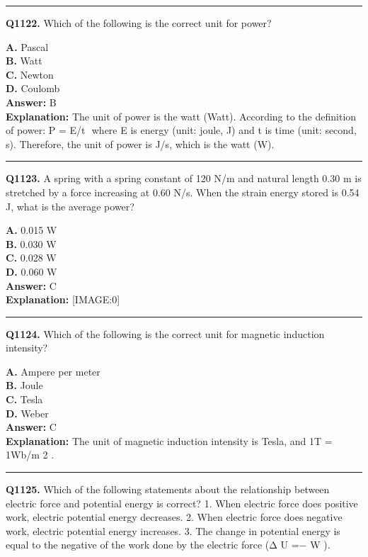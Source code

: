 \documentclass[12pt]{article}
\begin{document}
\hrule
\vspace{1em}


\noindent
\textbf{Q1122.} Which of the following is the correct unit for power?



\textbf{A.} Pascal \\
\textbf{B.} Watt \\
\textbf{C.} Newton \\
\textbf{D.} Coulomb \\

\textbf{Answer:} B \\
\textbf{Explanation:} The unit of power is the watt (Watt). According to the definition of power:
P
=
E/t
​
where
E
is energy (unit: joule, J) and
t
is time (unit: second, s). Therefore, the unit of power is J/s, which is the watt (W).

\hrule
\vspace{1em}


\noindent
\textbf{Q1123.} A spring with a spring constant of 120 N/m and natural length 0.30 m is stretched by a force increasing at 0.60 N/s. When the strain energy stored is 0.54 J, what is the average power?



\textbf{A.} 0.015 W \\
\textbf{B.} 0.030 W \\
\textbf{C.} 0.028 W \\
\textbf{D.} 0.060 W \\

\textbf{Answer:} C \\
\textbf{Explanation:} [IMAGE:0]

\hrule
\vspace{1em}


\noindent
\textbf{Q1124.} Which of the following is the correct unit for magnetic induction intensity?



\textbf{A.} Ampere per meter \\
\textbf{B.} Joule \\
\textbf{C.} Tesla \\
\textbf{D.} Weber \\

\textbf{Answer:} C \\
\textbf{Explanation:} The unit of magnetic induction intensity is Tesla, and 1T = 1Wb/m
2
.

\hrule
\vspace{1em}


\noindent
\textbf{Q1125.} Which of the following statements about the relationship between electric force and potential energy is correct?
1.
When electric force does positive work, electric potential energy decreases.
2.
When electric force does negative work, electric potential energy increases.
3.
The change in potential energy is equal to the negative of the work done by the electric force (Δ
U
=−
W
).
\end{document}
